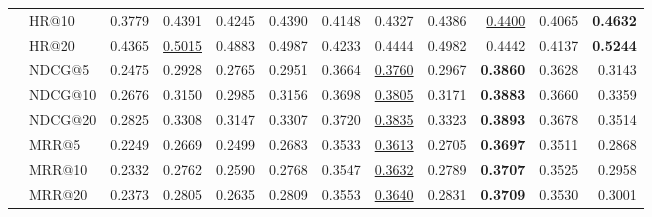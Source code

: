 \begin{tabular}{llrrrrrrrrrr}
 & HR@10 & 0.3779 & 0.4391 & 0.4245 & 0.4390 & 0.4148 & 0.4327 & 0.4386 & \underline{0.4400} & 0.4065 & \textbf{0.4632} \\
 & HR@20 & 0.4365 & \underline{0.5015} & 0.4883 & 0.4987 & 0.4233 & 0.4444 & 0.4982 & 0.4442 & 0.4137 & \textbf{0.5244} \\
 & NDCG@5 & 0.2475 & 0.2928 & 0.2765 & 0.2951 & 0.3664 & \underline{0.3760} & 0.2967 & \textbf{0.3860} & 0.3628 & 0.3143 \\
 & NDCG@10 & 0.2676 & 0.3150 & 0.2985 & 0.3156 & 0.3698 & \underline{0.3805} & 0.3171 & \textbf{0.3883} & 0.3660 & 0.3359 \\
 & NDCG@20 & 0.2825 & 0.3308 & 0.3147 & 0.3307 & 0.3720 & \underline{0.3835} & 0.3323 & \textbf{0.3893} & 0.3678 & 0.3514 \\
 & MRR@5 & 0.2249 & 0.2669 & 0.2499 & 0.2683 & 0.3533 & \underline{0.3613} & 0.2705 & \textbf{0.3697} & 0.3511 & 0.2868 \\
 & MRR@10 & 0.2332 & 0.2762 & 0.2590 & 0.2768 & 0.3547 & \underline{0.3632} & 0.2789 & \textbf{0.3707} & 0.3525 & 0.2958 \\
 & MRR@20 & 0.2373 & 0.2805 & 0.2635 & 0.2809 & 0.3553 & \underline{0.3640} & 0.2831 & \textbf{0.3709} & 0.3530 & 0.3001 \\
\hline
\end{tabular}

